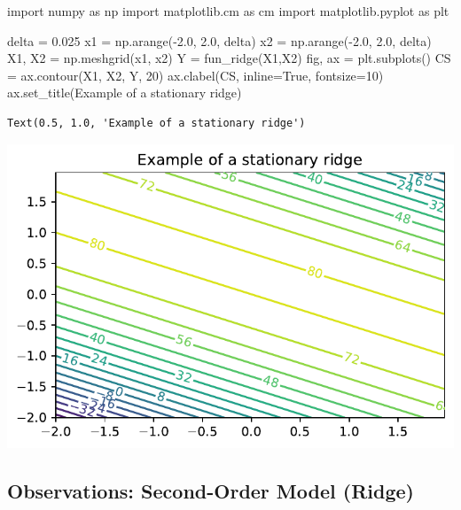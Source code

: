 \documentclass[
  letterpaper,
  DIV=11,
  numbers=noendperiod]{scrreprt}
\newenvironment{Shaded}{\begin{snugshade}}{\end{snugshade}}
\newcommand{\DecValTok}[1]{\textcolor[rgb]{0.68,0.00,0.00}{#1}}
\newcommand{\FloatTok}[1]{\textcolor[rgb]{0.68,0.00,0.00}{#1}}
\newcommand{\ImportTok}[1]{\textcolor[rgb]{0.00,0.46,0.62}{#1}}
\newcommand{\NormalTok}[1]{\textcolor[rgb]{0.00,0.23,0.31}{#1}}
\newcommand{\OperatorTok}[1]{\textcolor[rgb]{0.37,0.37,0.37}{#1}}
\newcommand{\StringTok}[1]{\textcolor[rgb]{0.13,0.47,0.30}{#1}}
\newcommand{\VariableTok}[1]{\textcolor[rgb]{0.07,0.07,0.07}{#1}}
\begin{document}
\begin{Shaded}
\begin{Highlighting}[]
\ImportTok{import}\NormalTok{ numpy }\ImportTok{as}\NormalTok{ np}
\ImportTok{import}\NormalTok{ matplotlib.cm }\ImportTok{as}\NormalTok{ cm}
\ImportTok{import}\NormalTok{ matplotlib.pyplot }\ImportTok{as}\NormalTok{ plt}

\NormalTok{delta }\OperatorTok{=} \FloatTok{0.025}
\NormalTok{x1 }\OperatorTok{=}\NormalTok{ np.arange(}\OperatorTok{{-}}\FloatTok{2.0}\NormalTok{, }\FloatTok{2.0}\NormalTok{, delta)}
\NormalTok{x2 }\OperatorTok{=}\NormalTok{ np.arange(}\OperatorTok{{-}}\FloatTok{2.0}\NormalTok{, }\FloatTok{2.0}\NormalTok{, delta)}
\NormalTok{X1, X2 }\OperatorTok{=}\NormalTok{ np.meshgrid(x1, x2)}
\NormalTok{Y }\OperatorTok{=}\NormalTok{ fun\_ridge(X1,X2)}
\NormalTok{fig, ax }\OperatorTok{=}\NormalTok{ plt.subplots()}
\NormalTok{CS }\OperatorTok{=}\NormalTok{ ax.contour(X1, X2, Y, }\DecValTok{20}\NormalTok{)}
\NormalTok{ax.clabel(CS, inline}\OperatorTok{=}\VariableTok{True}\NormalTok{, fontsize}\OperatorTok{=}\DecValTok{10}\NormalTok{)}
\NormalTok{ax.set\_title(}\StringTok{\textquotesingle{}Example of a stationary ridge\textquotesingle{}}\NormalTok{)}
\end{Highlighting}
\end{Shaded}

\begin{verbatim}
Text(0.5, 1.0, 'Example of a stationary ridge')
\end{verbatim}

\includegraphics{005_num_rsm_files/figure-pdf/cell-11-output-2.pdf}

\subsection{Observations: Second-Order Model
(Ridge)}\label{observations-second-order-model-ridge}
\end{document}
